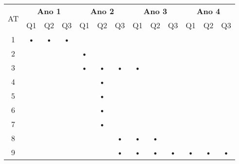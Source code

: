 \documentclass[12pt]{article}
\begin{document}
\begin{table}[htbp]
	\centering
		\begin{tabular}{|c|c|c|c|c|c|c|c|c|c|c|c|c|}
		\hline
		\multirow{2}{*}{AT} & \multicolumn{3}{c|}{\textbf{Ano 1}} & \multicolumn{3}{c|}{\textbf{Ano 2}} & \multicolumn{3}{c|}{\textbf{Ano 3}} & \multicolumn{3}{c|}{\textbf{Ano 4}} \\ \cline{2-13} 
												& Q1         & Q2         & Q3        & Q1         & Q2         & Q3        & Q1         & Q2         & Q3        & Q1         & Q2         & Q3        \\ \hline
		1                   & •          & •          & •         &            &            &           &            &            &           &            &            &           \\ \hline
		2                   &            &            &           & •          &            &           &            &            &           &            &            &           \\ \hline
		3                   &            &            &           & •          & •          & •         & •          &            &           &            &            &           \\ \hline
		4                   &            &            &           &            & •          &           &            &            &           &            &            &           \\ \hline
		5                   &            &            &           &            & •          &           &            &            &           &            &            &           \\ \hline
		6                   &            &            &           &            & •          &           &            &            &           &            &            &           \\ \hline
		7                   &            &            &           &            & •          &           &            &            &           &            &            &           \\ \hline
		8                   &            &            &           &            &            & •         & •          & •          &           &            &            &           \\ \hline
	  9                  &            &            &           &            &            & •         & •          & •          & •         & •          & •          & •         \\ \hline

\end{tabular}
\end{table}
\end{document}
